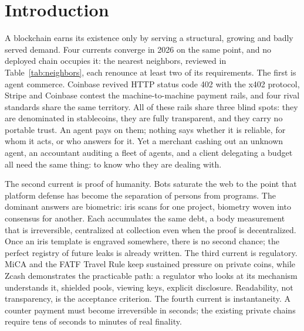 
\section{Introduction}\label{sec:intro}

A blockchain earns its existence only by serving a structural, growing and
badly served demand. Four currents converge in 2026 on the same point,
and no deployed chain occupies it: the nearest neighbors, reviewed in
Table~\ref{tab:neighbors}, each renounce at least two of its
requirements. The first is agent commerce. Coinbase revived
HTTP status code 402 with the x402 protocol, Stripe and Coinbase contest the
machine-to-machine payment rails, and four rival standards share the same
territory. All of these rails share three blind spots: they are denominated
in stablecoins, they are fully transparent, and they carry no portable
trust. An agent pays on them; nothing says whether it is reliable, for whom
it acts, or who answers for it. Yet a merchant cashing out an unknown agent,
an accountant auditing a fleet of agents, and a client delegating a budget
all need the same thing: to know who they are dealing with.

The second current is proof of humanity. Bots saturate the web to the point
that platform defense has become the separation of persons from programs.
The dominant answers are biometric: iris scans for one project, biometry
woven into consensus for another. Each accumulates the same debt, a body
measurement that is irreversible, centralized at collection even when the
proof is decentralized. Once an iris template is engraved somewhere, there
is no second chance; the perfect registry of future leaks is already
written. The third current is regulatory. MiCA and the FATF Travel Rule
keep sustained pressure on private coins, while Zcash demonstrates the
practicable path: a regulator who looks at its mechanism understands it,
shielded pools, viewing keys, explicit disclosure. Readability, not
transparency, is the acceptance criterion. The fourth current is
instantaneity. A counter payment must become irreversible in seconds; the
existing private chains require tens of seconds to minutes of real
finality.


